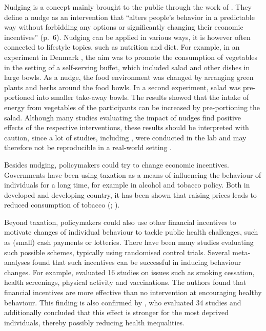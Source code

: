 \documentclass{scrbook}
\begin{document}
Nudging is a concept mainly brought to the public through the work of
\textcite{thaler_nudge_2008}. They define a nudge as an intervention
that ``alters people's behavior in a predictable way without forbidding
any options or significantly changing their economic incentives''
(p.~6). Nudging can be applied in various ways, it is however often
connected to lifestyle topics, such as nutrition and diet. For example,
in an experiment in Denmark \parencite{friis_comparison_2017}, the aim
was to promote the consumption of vegetables in the setting of a
self-serving buffet, which included salad and other dishes in large
bowls. As a nudge, the food environment was changed by arranging green
plants and herbs around the food bowls. In a second experiment, salad
was pre-portioned into smaller take-away bowls. The results showed that
the intake of energy from vegetables of the participants can be
increased by pre-portioning the salad. Although many studies evaluating
the impact of nudges find positive effects of the respective
interventions, these results should be interpreted with caution, since a
lot of studies, including \textcite{friis_comparison_2017}, were
conducted in the lab and may therefore not be reproducible in a
real-world setting \parencite{ledderer_nudging_2020}.

Besides nudging, policymakers could try to change economic incentives.
Governments have been using taxation as a means of influencing the
behaviour of individuals for a long time, for example in alcohol and
tobacco policy. Both in developed and developing country, it has been
shown that raising prices leads to reduced consumption of tobacco
(\cite{yeh_effects_2017}; \cite{immurana_effects_2021}).

Beyond taxation, policymakers could also use other financial incentives
to motivate changes of individual behaviour to tackle public health
challenges, such as (small) cash payments or lotteries. There have been
many studies evaluating such possible schemes, typically using
randomised control trials. Several meta-analyses found that such
incentives can be successful in inducing behaviour changes. For example,
\textcite{giles_effectiveness_2014} evaluated 16 studies on issues such
as smoking cessation, health screenings, physical activity and
vaccinations. The authors found that financial incentives are more
effective than no intervention at encouraging healthy behaviour. This
finding is also confirmed by \textcite{mantzari_personal_2015}, who
evaluated 34 studies and additionally concluded that this effect is
stronger for the most deprived individuals, thereby possibly reducing
health inequalities.
\end{document}
